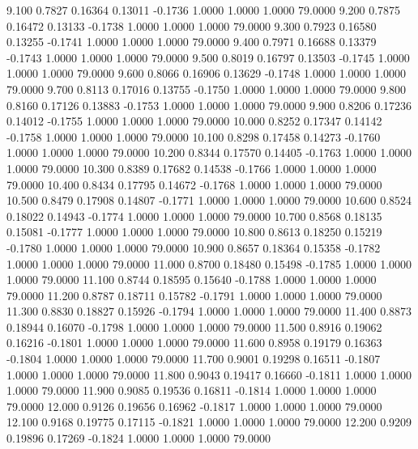    9.100   0.7827   0.16364   0.13011  -0.1736   1.0000   1.0000   1.0000  79.0000
   9.200   0.7875   0.16472   0.13133  -0.1738   1.0000   1.0000   1.0000  79.0000
   9.300   0.7923   0.16580   0.13255  -0.1741   1.0000   1.0000   1.0000  79.0000
   9.400   0.7971   0.16688   0.13379  -0.1743   1.0000   1.0000   1.0000  79.0000
   9.500   0.8019   0.16797   0.13503  -0.1745   1.0000   1.0000   1.0000  79.0000
   9.600   0.8066   0.16906   0.13629  -0.1748   1.0000   1.0000   1.0000  79.0000
   9.700   0.8113   0.17016   0.13755  -0.1750   1.0000   1.0000   1.0000  79.0000
   9.800   0.8160   0.17126   0.13883  -0.1753   1.0000   1.0000   1.0000  79.0000
   9.900   0.8206   0.17236   0.14012  -0.1755   1.0000   1.0000   1.0000  79.0000
  10.000   0.8252   0.17347   0.14142  -0.1758   1.0000   1.0000   1.0000  79.0000
  10.100   0.8298   0.17458   0.14273  -0.1760   1.0000   1.0000   1.0000  79.0000
  10.200   0.8344   0.17570   0.14405  -0.1763   1.0000   1.0000   1.0000  79.0000
  10.300   0.8389   0.17682   0.14538  -0.1766   1.0000   1.0000   1.0000  79.0000
  10.400   0.8434   0.17795   0.14672  -0.1768   1.0000   1.0000   1.0000  79.0000
  10.500   0.8479   0.17908   0.14807  -0.1771   1.0000   1.0000   1.0000  79.0000
  10.600   0.8524   0.18022   0.14943  -0.1774   1.0000   1.0000   1.0000  79.0000
  10.700   0.8568   0.18135   0.15081  -0.1777   1.0000   1.0000   1.0000  79.0000
  10.800   0.8613   0.18250   0.15219  -0.1780   1.0000   1.0000   1.0000  79.0000
  10.900   0.8657   0.18364   0.15358  -0.1782   1.0000   1.0000   1.0000  79.0000
  11.000   0.8700   0.18480   0.15498  -0.1785   1.0000   1.0000   1.0000  79.0000
  11.100   0.8744   0.18595   0.15640  -0.1788   1.0000   1.0000   1.0000  79.0000
  11.200   0.8787   0.18711   0.15782  -0.1791   1.0000   1.0000   1.0000  79.0000
  11.300   0.8830   0.18827   0.15926  -0.1794   1.0000   1.0000   1.0000  79.0000
  11.400   0.8873   0.18944   0.16070  -0.1798   1.0000   1.0000   1.0000  79.0000
  11.500   0.8916   0.19062   0.16216  -0.1801   1.0000   1.0000   1.0000  79.0000
  11.600   0.8958   0.19179   0.16363  -0.1804   1.0000   1.0000   1.0000  79.0000
  11.700   0.9001   0.19298   0.16511  -0.1807   1.0000   1.0000   1.0000  79.0000
  11.800   0.9043   0.19417   0.16660  -0.1811   1.0000   1.0000   1.0000  79.0000
  11.900   0.9085   0.19536   0.16811  -0.1814   1.0000   1.0000   1.0000  79.0000
  12.000   0.9126   0.19656   0.16962  -0.1817   1.0000   1.0000   1.0000  79.0000
  12.100   0.9168   0.19775   0.17115  -0.1821   1.0000   1.0000   1.0000  79.0000
  12.200   0.9209   0.19896   0.17269  -0.1824   1.0000   1.0000   1.0000  79.0000
